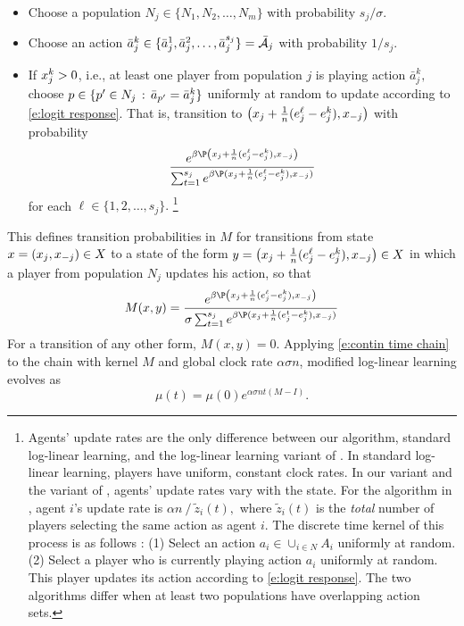 \begin{itemize}
\item Choose a population $N_j\in \{N_1,N_2,\ldots,N_m\}$ with probability $s_j/\sigma.$
\item Choose an action $\bar{a}_j^k\in \{\bar{a}_j^1,\bar{a}_j^2,\ldots,\bar{a}_j^{s_j}\} =  \bar{\mathcal{A}}_{j}$ with probability $1/s_j.$ 
\item If $x_j^k>0$, i.e., at least one player from population $j$ is playing action $\bar{a}_j^k,$ choose $p\in \{p^\prime\in N_j \,:\, \bar{a}_{p^\prime} = \bar{a}_{j}^k\}$ uniformly at random to update according to \eqref{e:logit response}. That is, transition to $ \left(x_j + \frac{1}{n}(e_j^{\ell} - e_j^k),x_{-j}\right)$ with probability 
\begin{equation*}\label{e:logit response 2}
\frac{e^{\beta \P\left(\bx_{j} + \frac{1}{n}(e_j^{\ell} - e_j^k),\bx_{-j}\right)}}{\sum_{t =1}^{s_j} e^{\beta\P(\bx_{j} + \frac{1}{n}(e^{\ell}_j - e_j^k), \bx_{-j})}}
\end{equation*}
for each $\ell\in \{1,2,\ldots,s_j\}.$
\footnote{Agents' update rates are the only difference between our algorithm, standard log-linear learning, and the log-linear learning variant of \cite{Shah2010}. In standard log-linear learning, players have uniform, constant clock rates. In our variant and the variant of \cite{Shah2010}, agents' update rates vary with the state. For the algorithm in \cite{Shah2010}, agent $i$'s update rate is $\alpha n\mathop{/}\tilde{z}_i(t),$ where $\tilde{z}_i(t)$ is the \emph{total} number of players selecting the same action as agent $i$. The discrete time kernel of this process is as follows \cite{Shah2010}:
(1) Select an action $a_i\in \cup_{i\in N} A_i$ uniformly at random.
(2) Select a player who is currently playing action $a_i$ uniformly at random. This player updates its action according to \eqref{e:logit response}.
The two algorithms differ when at least two populations have overlapping action sets. }
\end{itemize}

This defines transition probabilities in $M$ for transitions from state $x = (x_{j},x_{-j})\in X$ to a state of the form $y = \left(x_{j} + \frac{1}{n}(e^{\ell}_j - e_j^k),x_{-j}\right)\in X$ in which a player from population $N_j$ updates his action, so that
\begin{align}
M(x,y) =\frac{e^{\beta \P\left(\bx_{j} + \frac{1}{n}(e^{\ell}_j - e_j^k),\bx_{-j}\right)}}{\sigma\sum_{t =1}^{s_j} e^{\beta\P(\bx_{j} + \frac{1}{n}(e^{t}_j - e_j^k), \bx_{-j})}}\label{e:Markov transition probs}
\end{align}
\normalsize
For a transition of any other form, 
$M(x,y) = 0.$
Applying \eqref{e:contin time chain} to the chain with kernel $M$ and global clock rate $\alpha\sigma n$, modified log-linear learning evolves as
\begin{equation}
\mu(t) = \mu(0)e^{\alpha\sigma n t (M-I)}.
\end{equation}

